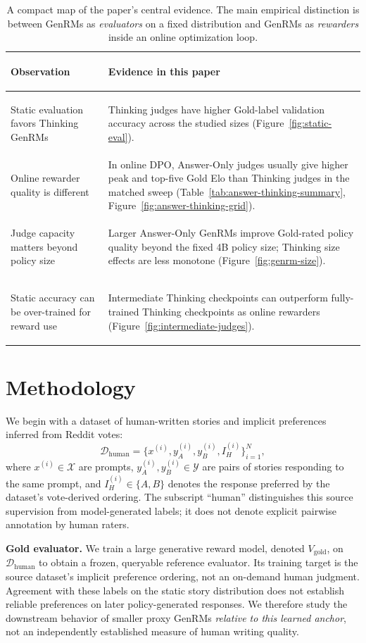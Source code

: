 \documentclass[11pt,letterpaper]{article}
\begin{document}
\begin{table}[htbp]
\centering
\small
\begin{tabularx}{\textwidth}{>{\bfseries\raggedright\arraybackslash}p{}>{\raggedright\arraybackslash}X}
\toprule
Observation & Evidence in this paper \\
\midrule
Static evaluation favors Thinking GenRMs & Thinking judges have higher Gold-label validation accuracy across the studied sizes (Figure~\ref{fig:static-eval}). \\
Online rewarder quality is different & In online DPO, Answer-Only judges usually give higher peak and top-five Gold Elo than Thinking judges in the matched sweep (Table~\ref{tab:answer-thinking-summary}, Figure~\ref{fig:answer-thinking-grid}). \\
Judge capacity matters beyond policy size & Larger Answer-Only GenRMs improve Gold-rated policy quality beyond the fixed 4B policy size; Thinking size effects are less monotone (Figure~\ref{fig:genrm-size}). \\
Static accuracy can be over-trained for reward use & Intermediate Thinking checkpoints can outperform fully-trained Thinking checkpoints as online rewarders (Figure~\ref{fig:intermediate-judges}). \\
\bottomrule
\end{tabularx}
\caption{A compact map of the paper's central evidence. The main empirical distinction is between GenRMs as \emph{evaluators} on a fixed distribution and GenRMs as \emph{rewarders} inside an online optimization loop.}
\label{tab:storyline}
\end{table}

\section{Methodology}

We begin with a dataset of human-written stories and implicit preferences inferred from Reddit votes:
\[
\mathcal{D}_{\text{human}} = \{x^{(i)}, y_A^{(i)}, y_B^{(i)}, I_H^{(i)}\}_{i=1}^N,
\]
where $x^{(i)} \in \mathcal{X}$ are prompts, $y_A^{(i)}, y_B^{(i)} \in \mathcal{Y}$ are pairs of stories responding to the same prompt, and $I_H^{(i)} \in \{A, B\}$ denotes the response preferred by the dataset's vote-derived ordering. The subscript ``human'' distinguishes this source supervision from model-generated labels; it does not denote explicit pairwise annotation by human raters.

\textbf{Gold evaluator.} We train a large generative reward model, denoted $V_{\text{gold}}$, on $\mathcal{D}_{\text{human}}$ to obtain a frozen, queryable reference evaluator. Its training target is the source dataset's implicit preference ordering, not an on-demand human judgment. Agreement with these labels on the static story distribution does not establish reliable preferences on later policy-generated responses. We therefore study the downstream behavior of smaller proxy GenRMs \emph{relative to this learned anchor}, not an independently established measure of human writing quality.
\end{document}
